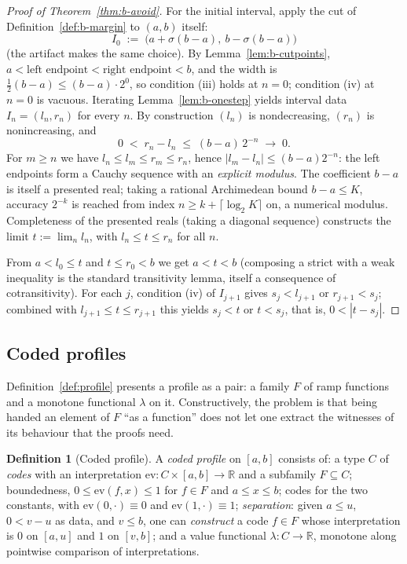\documentclass[11pt]{article}
\theoremstyle{definition}
\newtheorem{definition}[theorem]{Definition}
\theoremstyle{remark}
\begin{document}
\begin{proof}[Proof of Theorem~\ref{thm:b-avoid}]
For the initial interval, apply the cut of Definition~\ref{def:b-margin} to $(a,b)$ itself:
\[
I_0\;:=\;\bigl(a+\sigma(b-a),\ b-\sigma(b-a)\bigr)
\]
(the artifact makes the same choice).  By Lemma~\ref{lem:b-cutpoints}, $a<\text{left endpoint}<\text{right endpoint}<b$, and the width is $\tfrac12(b-a)\le (b-a)\cdot2^{0}$, so condition (iii) holds at $n=0$; condition (iv) at $n=0$ is vacuous.  Iterating Lemma~\ref{lem:b-onestep} yields interval data $I_n=(l_n,r_n)$ for every $n$.  By construction $(l_n)$ is nondecreasing, $(r_n)$ is nonincreasing, and
\[
0\;<\;r_n-l_n\;\le\;(b-a)\,2^{-n}\;\longrightarrow\;0 .
\]
For $m\ge n$ we have $l_n\le l_m\le r_m\le r_n$, hence $|l_m-l_n|\le (b-a)2^{-n}$: the left endpoints form a Cauchy sequence with an \emph{explicit modulus}.  The coefficient $b-a$ is itself a presented real; taking a rational Archimedean bound $b-a\le K$, accuracy $2^{-k}$ is reached from index $n\ge k+\lceil\log_2 K\rceil$ on, a numerical modulus.  Completeness of the presented reals (taking a diagonal sequence) constructs the limit $t:=\lim_n l_n$, with $l_n\le t\le r_n$ for all $n$.

From $a<l_0\le t$ and $t\le r_0<b$ we get $a<t<b$ (composing a strict with a weak inequality is the standard transitivity lemma, itself a consequence of cotransitivity).  For each $j$, condition (iv) of $I_{j+1}$ gives $s_j<l_{j+1}$ or $r_{j+1}<s_j$; combined with $l_{j+1}\le t\le r_{j+1}$ this yields $s_j<t$ or $t<s_j$, that is, $0<|t-s_j|$.
\end{proof}

\subsection{Coded profiles}
\label{sec:b-coded}

Definition~\ref{def:profile} presents a profile as a pair: a family $F$ of ramp functions and a monotone functional $\lambda$ on it.  Constructively, the problem is that being handed an element of $F$ ``as a function'' does not let one extract the witnesses of its behaviour that the proofs need.

\begin{definition}[Coded profile]
\label{def:b-coded}
A \emph{coded profile} on $[a,b]$ consists of: a type $C$ of \emph{codes} with an interpretation $\mathrm{ev}:C\times[a,b]\to\mathbb{R}$ and a subfamily $F\subseteq C$; boundedness, $0\le \mathrm{ev}(f,x)\le1$ for $f\in F$ and $a\le x\le b$; codes for the two constants, with $\mathrm{ev}(0,\cdot)\equiv0$ and $\mathrm{ev}(1,\cdot)\equiv1$; \emph{separation}: given $a\le u$, $0<v-u$ as data, and $v\le b$, one can \emph{construct} a code $f\in F$ whose interpretation is $0$ on $[a,u]$ and $1$ on $[v,b]$; and a value functional $\lambda:C\to\mathbb{R}$, monotone along pointwise comparison of interpretations.
\end{definition}
\end{document}
